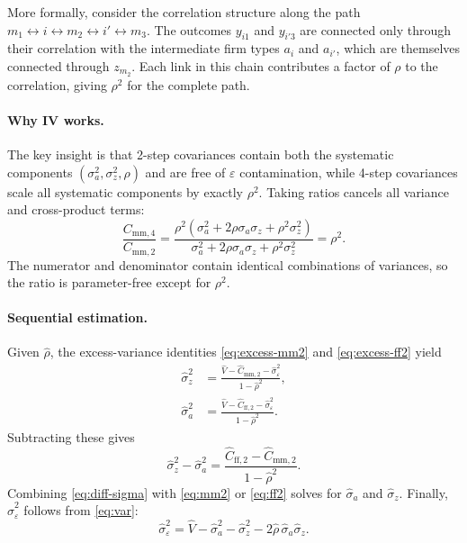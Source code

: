 \documentclass[11pt]{article}
\begin{document}
More formally, consider the correlation structure along the path $m_1 \leftrightarrow i \leftrightarrow m_2 \leftrightarrow i' \leftrightarrow m_3$. The outcomes $y_{i1}$ and $y_{i'3}$ are connected only through their correlation with the intermediate firm types $a_i$ and $a_{i'}$, which are themselves connected through $z_{m_2}$. Each link in this chain contributes a factor of $\rho$ to the correlation, giving $\rho^2$ for the complete path.

\paragraph{Why IV works.} The key insight is that 2-step covariances contain both the systematic components $(\sigma_a^2, \sigma_z^2, \rho)$ and are free of $\varepsilon$ contamination, while 4-step covariances scale all systematic components by exactly $\rho^2$. Taking ratios cancels all variance and cross-product terms:
\begin{equation}
 \frac{C_{\text{mm},4}}{C_{\text{mm},2}} = \frac{\rho^2(\sigma_a^2 + 2\rho\sigma_a\sigma_z + \rho^2\sigma_z^2)}{\sigma_a^2 + 2\rho\sigma_a\sigma_z + \rho^2\sigma_z^2} = \rho^2.
\end{equation}
The numerator and denominator contain identical combinations of variances, so the ratio is parameter-free except for $\rho^2$.

\paragraph{Sequential estimation.} Given $\widehat\rho$, the excess-variance identities \eqref{eq:excess-mm2} and \eqref{eq:excess-ff2} yield
\begin{align}
\label{eq:seq-est}
 \widehat\sigma_z^2 &= \frac{\widehat V - \widehat C_{\text{mm},2} - \widehat\sigma_\varepsilon^2}{1 - \widehat\rho^2}, \\
 \widehat\sigma_a^2 &= \frac{\widehat V - \widehat C_{\text{ff},2} - \widehat\sigma_\varepsilon^2}{1 - \widehat\rho^2}.
\end{align}
Subtracting these gives
\begin{equation}
\label{eq:diff-sigma}
 \widehat\sigma_z^2 - \widehat\sigma_a^2 = \frac{\widehat C_{\text{ff},2} - \widehat C_{\text{mm},2}}{1 - \widehat\rho^2}.
\end{equation}
Combining \eqref{eq:diff-sigma} with \eqref{eq:mm2} or \eqref{eq:ff2} solves for $\widehat\sigma_a$ and $\widehat\sigma_z$. Finally, $\widehat\sigma_\varepsilon^2$ follows from \eqref{eq:var}:
\begin{equation}
\label{eq:eps-est}
 \widehat\sigma_\varepsilon^2 = \widehat V - \widehat\sigma_a^2 - \widehat\sigma_z^2 - 2\widehat\rho\,\widehat\sigma_a\widehat\sigma_z.
\end{equation}
\end{document}
